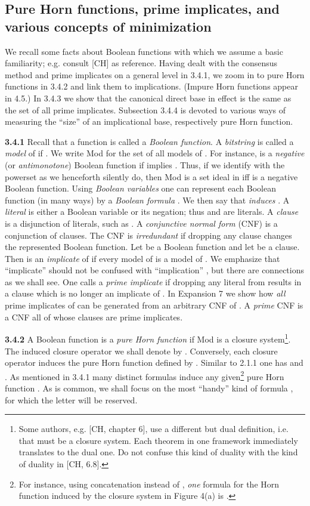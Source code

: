 \documentclass[11pt]{article}
\begin{document}
\subsection{Pure Horn functions, prime implicates, and various concepts of minimization}

We recall some facts about Boolean functions with which we assume a basic familiarity; e.g. consult [CH] as reference. Having dealt with the consensus method and prime implicates on a general level in 3.4.1, we zoom in to pure Horn functions in 3.4.2 and link them to implications. (Impure Horn functions appear in 4.5.) In 3.4.3 we show that the canonical direct base  in effect is the same as the set of all prime implicates. Subsection 3.4.4 is devoted to various ways of measuring the ``size'' of an implicational base, respectively pure Horn function.

{\bf 3.4.1} Recall that a function  is called a {\it Boolean function}. A {\it bitstring}  is called a {\it model} of  if . We write Mod for the set of all models of . For instance,  is a {\it negative} (or {\it antimonotone}) Boolean function if  implies .  
Thus, if we identify  with the powerset  as we henceforth silently do, then Mod is a set ideal in  iff  is a negative Boolean function. Using {\it Boolean variables}  one can represent each Boolean function  (in many ways) by a {\it Boolean formula} . We then say that  {\it induces} . A {\it literal} is either a Boolean variable or its negation; thus  and  are literals. A {\it clause} is a disjunction of literals, such as . A {\it conjunctive normal form} (CNF) is a conjunction of clauses.  The CNF is {\it irredundant} if dropping any clause changes the represented Boolean function. Let  be a Boolean function and let  be a clause. Then  is an {\it implicate} of  if every model of  is a model of . We emphasize that ``implicate'' should not be confused with ``implication'' , but there are connections as we shall see. One calls  a {\it prime implicate} if dropping any literal from  results in a clause which is no longer an implicate of . In Expansion 7 we show how {\it all} prime implicates of  can be generated from an arbitrary CNF of . A {\it prime} CNF is a CNF all of whose clauses are prime implicates.



{\bf 3.4.2} A Boolean function  is a {\it pure Horn function} if Mod is a closure system\footnote{Some authors, e.g. [CH, chapter 6], use a different but dual definition, i.e. that  must be a closure system. Each theorem in one framework immediately translates to the dual one. Do not confuse this kind of duality with the kind of duality in [CH, 6.8].}. 
The induced closure operator  we shall denote by . Conversely, each closure operator  induces the pure Horn function  defined by . Similar to 2.1.1 one has  and . As mentioned in 3.4.1 many distinct formulas  induce any given\footnote{For instance, using concatenation instead of , {\it one} formula  for the Horn function  induced by the closure system in Figure 4(a) is  .} pure Horn function . 
As is common, we shall focus on the most ``handy'' kind of formula , for which the letter  will be reserved. 
\end{document}
